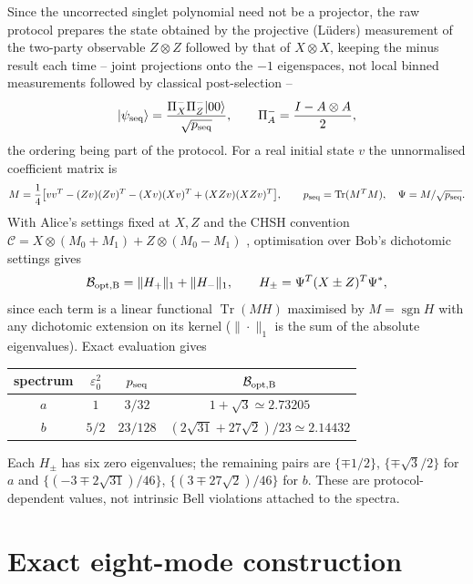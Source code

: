\documentclass[11pt,a4paper]{article}
\newcommand{\sgn}{\operatorname{sgn}}
\newcommand{\Tr}{\operatorname{Tr}}
\newcommand{\ket}[1]{|#1\rangle}
\begin{document}
Since the uncorrected singlet polynomial need not be a projector, the raw protocol prepares the state obtained by the projective (L\"uders) measurement of the two-party observable $Z\otimes Z$ followed by that of $X\otimes X$, keeping the minus result each time -- joint projections onto the $-1$ eigenspaces, not local binned measurements followed by classical post-selection --
\begin{equation}
\ket{\psi_{\rm seq}}=\frac{\Pi^-_X\Pi^-_Z\ket{00}}{\sqrt{p_{\rm seq}}},\qquad \Pi^-_A=\frac{I-A\otimes A}2 ,
\end{equation}
the ordering being part of the protocol. For a real initial state $v$ the unnormalised coefficient matrix is
\begin{equation}
M=\frac14\big[vv^T-(Zv)(Zv)^T-(Xv)(Xv)^T+(XZv)(XZv)^T\big],\qquad p_{\rm seq}=\Tr(M^TM),\quad\Psi=M/\sqrt{p_{\rm seq}}.
\end{equation}
With Alice's settings fixed at $X,Z$ and the CHSH convention $\mathcal C=X\otimes(M_0+M_1)+Z\otimes(M_0-M_1)$ \cite{CHSH1969}, optimisation over Bob's dichotomic settings gives
\begin{equation}
\mathcal B_{\rm opt,B}=\|H_+\|_1+\|H_-\|_1,\qquad H_\pm=\Psi^T(X\pm Z)^T\Psi^*,
\end{equation}
since each term is a linear functional $\Tr(MH)$ maximised by $M=\sgn H$ with any dichotomic extension on its kernel ($\|\cdot\|_1$ is the sum of the absolute eigenvalues). Exact evaluation gives
\begin{center}
\begin{tabular}{cccc}
\toprule
spectrum & $\varepsilon_0^2$ & $p_{\rm seq}$ & $\mathcal B_{\rm opt,B}$\\
\midrule
$a$ & $1$ & $3/32$ & $1+\sqrt3\simeq2.73205$\\
$b$ & $5/2$ & $23/128$ & $(2\sqrt{31}+27\sqrt2)/23\simeq2.14432$\\
\bottomrule
\end{tabular}
\end{center}
Each $H_\pm$ has six zero eigenvalues; the remaining pairs are $\{\mp1/2\}$, $\{\mp\sqrt3/2\}$ for $a$ and $\{(-3\mp2\sqrt{31})/46\}$, $\{(3\mp27\sqrt2)/46\}$ for $b$. These are protocol-dependent values, not intrinsic Bell violations attached to the spectra.

\section{Exact eight-mode construction}
\label{app:eight}
\end{document}
